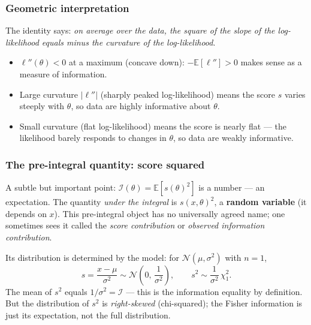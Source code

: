 \documentclass[a4paper,oneside,12pt]{extarticle}
\theoremstyle{plain}
\theoremstyle{definition}
\theoremstyle{remark}
\newcommand*{\E}{\mathbb{E}}
\begin{document}
\subsubsection{Geometric interpretation}

The identity says: \emph{on average over the data, the square of the
slope of the log-likelihood equals minus the curvature of the
log-likelihood}.

\begin{itemize}
  \item $\ell''(\theta) < 0$ at a maximum (concave down): $-\E[\ell'']>0$ makes sense as a measure of information.
  \item Large curvature $|\ell''|$ (sharply peaked log-likelihood)
    means the score $s$ varies steeply with $\theta$, so data are
    highly informative about $\theta$.
  \item Small curvature (flat log-likelihood) means the score is
    nearly flat --- the likelihood barely responds to changes in
    $\theta$, so data are weakly informative.
\end{itemize}

\subsubsection{The pre-integral quantity: score squared}

A subtle but important point: $\mathcal{I}(\theta) = \E[s(\theta)^2]$
is a number --- an expectation.  The quantity \emph{under the integral}
is $s(x,\theta)^2$, a \textbf{random variable} (it depends on $x$).
This pre-integral object has no universally agreed name; one sometimes
sees it called the \emph{score contribution} or \emph{observed
information contribution}.

Its distribution is determined by the model: for
$\mathcal{N}(\mu,\sigma^2)$ with $n=1$,
\[
  s = \frac{x-\mu}{\sigma^2} \sim \mathcal{N}\!\left(0,\,\frac{1}{\sigma^2}\right),
  \qquad
  s^2 \sim \frac{1}{\sigma^2}\,\chi^2_1.
\]
The mean of $s^2$ equals $1/\sigma^2 = \mathcal{I}$ --- this is the
information equality by definition.  But the distribution of $s^2$ is
\emph{right-skewed} (chi-squared); the Fisher information is just its
expectation, not the full distribution.
\end{document}
